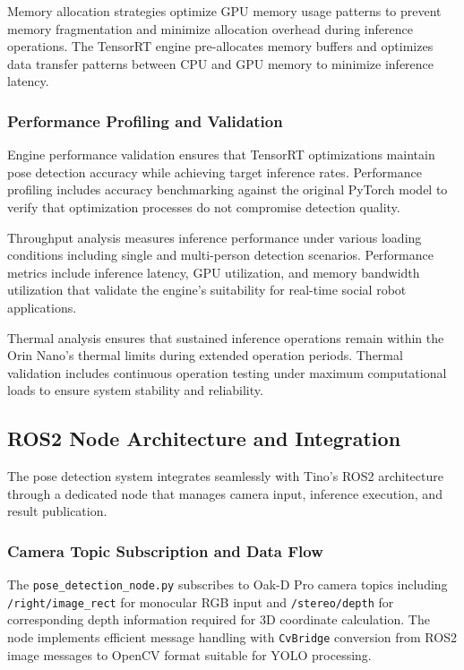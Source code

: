 Memory allocation strategies optimize GPU memory usage patterns to prevent memory fragmentation and minimize allocation overhead during inference operations. The TensorRT engine pre-allocates memory buffers and optimizes data transfer patterns between CPU and GPU memory to minimize inference latency.

\subsubsection{Performance Profiling and Validation}

Engine performance validation ensures that TensorRT optimizations maintain pose detection accuracy while achieving target inference rates. Performance profiling includes accuracy benchmarking against the original PyTorch model to verify that optimization processes do not compromise detection quality.

Throughput analysis measures inference performance under various loading conditions including single and multi-person detection scenarios. Performance metrics include inference latency, GPU utilization, and memory bandwidth utilization that validate the engine's suitability for real-time social robot applications.

Thermal analysis ensures that sustained inference operations remain within the Orin Nano's thermal limits during extended operation periods. Thermal validation includes continuous operation testing under maximum computational loads to ensure system stability and reliability.

\subsection{ROS2 Node Architecture and Integration}

The pose detection system integrates seamlessly with Tino's ROS2 architecture through a dedicated node that manages camera input, inference execution, and result publication.

\subsubsection{Camera Topic Subscription and Data Flow}

The \texttt{pose\_detection\_node.py} subscribes to Oak-D Pro camera topics including \texttt{/right/image\_rect} for monocular RGB input and \texttt{/stereo/depth} for corresponding depth information required for 3D coordinate calculation. The node implements efficient message handling with \texttt{CvBridge} conversion from ROS2 image messages to OpenCV format suitable for YOLO processing.

